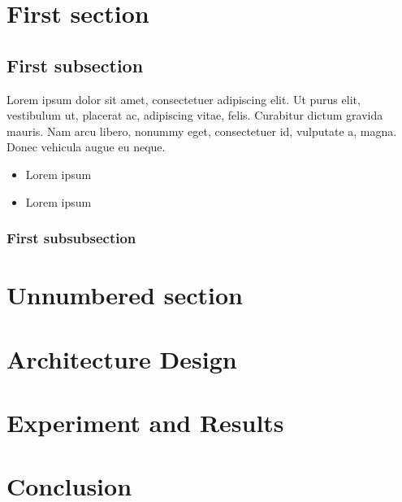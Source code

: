 \documentclass[12pt]{article}
\begin{document}
\newpage

\section{First section}
\lipsum[1]

\fullboxbegin
\lipsum[1]
\fullboxend

\lipsum[1]

\subsection{First subsection}
\lipsum[1]

\leftboxbegin
Lorem ipsum dolor sit amet, consectetuer adipiscing elit. Ut purus elit, vestibulum ut, placerat ac, adipiscing vitae, felis. Curabitur dictum gravida mauris. Nam arcu libero, nonummy eget, consectetuer id, vulputate a, magna. Donec vehicula augue eu neque. 
\leftboxend

\lipsum[1-2]

\rightboxbegin
\begin{itemize}
 \item Lorem ipsum
 \item Lorem ipsum
\end{itemize}
\rightboxend

\lipsum[1]

\subsubsection{First subsubsection}

\lipsum[1]

\section*{Unnumbered section}
\lipsum[1]



\lipsum[1]
\frameboxend

\newpage

\section{Architecture Design}
\lipsum[1]

\section{Experiment and Results}
\lipsum[1]

\section{Conclusion}
\lipsum[1]
\end{document}

